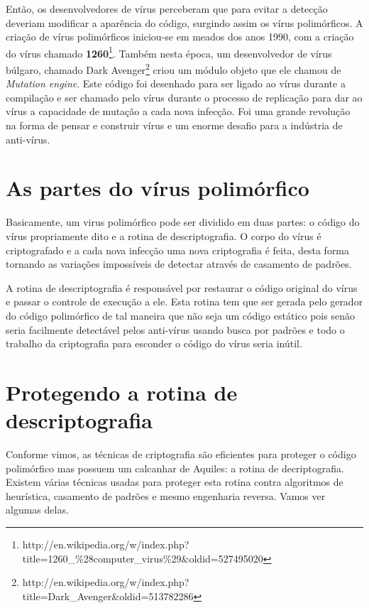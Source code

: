 Então, os desenvolvedores de vírus perceberam que para evitar a detecção deveriam modificar a aparência do código, surgindo assim os vírus polimórficos. A criação de vírus polimórficos iniciou-se em meados dos anos 1990, com a criação do vírus chamado \textbf{1260}\footnote{http://en.wikipedia.org/w/index.php?title=1260\_\%28computer\_virus\%29\&oldid=527495020}. Também nesta época, um desenvolvedor de vírus búlgaro, chamado Dark Avenger\footnote{http://en.wikipedia.org/w/index.php?title=Dark\_Avenger\&oldid=513782286} criou um módulo objeto que ele chamou de \textit{Mutation engine}. Este código foi desenhado para ser ligado ao vírus durante a compilação e ser chamado pelo vírus durante o processo de replicação para dar ao vírus a capacidade de mutação a cada nova infecção. Foi uma grande revolução na forma de pensar e construir vírus e um enorme desafio para a indústria de anti-vírus. 

\section{As partes do vírus polimórfico}
Basicamente, um virus polimórfico pode ser dividido em duas partes: o código do vírus propriamente dito e a rotina de descriptografia. O corpo do vírus é criptografado e a cada nova infecção uma nova criptografia é feita, desta forma tornando as variações impossíveis de detectar através de casamento de padrões.

A rotina de descriptografia é responsável por restaurar o código original do vírus e passar o controle de execução a ele. Esta rotina tem que ser gerada pelo gerador do código polimórfico de tal maneira que não seja um código estático pois senão seria facilmente detectável pelos anti-vírus usando busca por padrões e todo o trabalho da criptografia para esconder o código do vírus seria inútil.


\section{Protegendo a rotina de descriptografia}
Conforme vimos, as técnicas de criptografia são eficientes para proteger o código polimórfico mas possuem um calcanhar de Aquiles: a rotina de decriptografia. Existem várias técnicas usadas para proteger esta rotina contra algoritmos de heurística, casamento de padrões e mesmo engenharia reversa. Vamos ver algumas delas.

